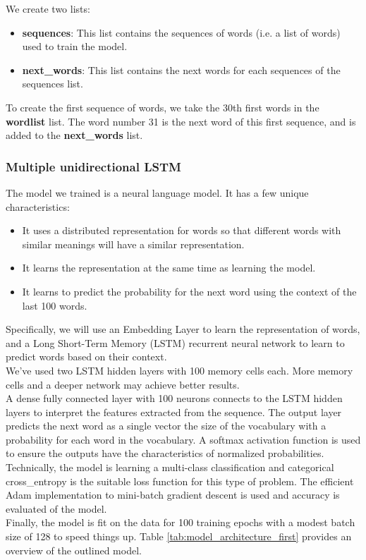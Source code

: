 \documentclass[conference]{IEEEtran}
\begin{document}
We create two lists:

\begin{itemize}
\item \textbf{sequences}: This list contains the sequences of words (i.e. a list of words) used to train the model.
\item \textbf{next\_words}: This list contains the next words for each sequences of the sequences list.
\end{itemize}

To create the first sequence of words, we take the 30th first words in the \textbf{wordlist} list. The word number 31 is the next word of this first sequence, and is added to the \textbf{next\_words} list.

\subsubsection{Multiple unidirectional LSTM}\label{subsec_embedding_layer}

The model we trained is a neural language model. It has a few unique characteristics:

\begin{itemize}
\item It uses a distributed representation for words so that different words with similar meanings will have a similar representation.
\item It learns the representation at the same time as learning the model.
\item It learns to predict the probability for the next word using the context of the last 100 words.
\end{itemize}

Specifically, we will use an Embedding Layer to learn the representation of words, and a Long Short-Term Memory (LSTM) recurrent neural network to learn to predict words based on their context.\\
We’ve used two LSTM hidden layers with 100 memory cells each. More memory cells and a deeper network may achieve better results.\\
A dense fully connected layer with 100 neurons connects to the LSTM hidden layers to interpret the features extracted from the sequence. The output layer predicts the next word as a single vector the size of the vocabulary with a probability for each word in the vocabulary. A softmax activation function is used to ensure the outputs have the characteristics of normalized probabilities.\\
Technically, the model is learning a multi-class classification and categorical cross\_entropy is the suitable loss function for this type of problem. The efficient Adam implementation to mini-batch gradient descent is used and accuracy is evaluated of the model.\\
Finally, the model is fit on the data for 100 training epochs with a modest batch size of 128 to speed things up. Table \ref{tab:model_architecture_first} provides an overview of the outlined model.
\end{document}
